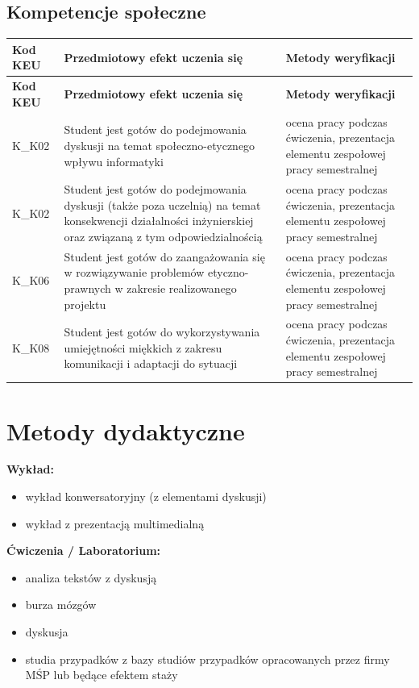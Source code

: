 \documentclass[12pt, a4paper]{article}
\newcommand{\thdrule}{\noalign{\global\setlength{\extrarowheight}{0pt}}}
\newcommand{\thdend}{\noalign{\global\setlength{\extrarowheight}{3pt}}}
\begin{document}
\subsection*{Kompetencje społeczne}
{\scriptsize
\begin{longtable}{m{1.6cm}m{9.0cm}m{4.2cm}}
\thdrule\toprule
\rowcolor{pjatkRed} {\color{white}\footnotesize\textbf{\vphantom{Ag}Kod KEU}} & {\color{white}\footnotesize\textbf{\vphantom{Ag}Przedmiotowy efekt uczenia się}} & {\color{white}\footnotesize\textbf{\vphantom{Ag}Metody weryfikacji}} \\
\midrule\thdend
\endfirsthead
\thdrule\toprule
\rowcolor{pjatkRed} {\color{white}\footnotesize\textbf{\vphantom{Ag}Kod KEU}} & {\color{white}\footnotesize\textbf{\vphantom{Ag}Przedmiotowy efekt uczenia się}} & {\color{white}\footnotesize\textbf{\vphantom{Ag}Metody weryfikacji}} \\
\midrule\thdend
\endhead
  \rowcolor{tableRowLight} K\_K02 & Student jest gotów do  podejmowania dyskusji na temat społeczno-etycznego wpływu informatyki & ocena pracy podczas ćwiczenia, prezentacja elementu zespołowej pracy semestralnej \\
  \rowcolor{tableRowAlt} K\_K02 & Student jest gotów do  podejmowania dyskusji (także poza uczelnią) na temat konsekwencji działalności inżynierskiej oraz związaną z tym odpowiedzialnością & ocena pracy podczas ćwiczenia, prezentacja elementu zespołowej pracy semestralnej \\
  \rowcolor{tableRowLight} K\_K06 & Student jest gotów do  zaangażowania się w rozwiązywanie problemów etyczno-prawnych w zakresie realizowanego projektu & ocena pracy podczas ćwiczenia, prezentacja elementu zespołowej pracy semestralnej \\
  \rowcolor{tableRowAlt} K\_K08 & Student jest gotów do  wykorzystywania umiejętności miękkich z zakresu komunikacji i adaptacji do sytuacji & ocena pracy podczas ćwiczenia, prezentacja elementu zespołowej pracy semestralnej \\
\bottomrule
\end{longtable}}

\section{Metody dydaktyczne}

\textbf{Wykład:}
\begin{itemize}
  \item wykład konwersatoryjny (z elementami dyskusji)
  \item wykład z prezentacją multimedialną
\end{itemize}
\vspace{4pt}
\textbf{Ćwiczenia / Laboratorium:}
\begin{itemize}
  \item analiza tekstów z dyskusją
  \item burza mózgów
  \item dyskusja
  \item studia przypadków z bazy studiów przypadków opracowanych przez firmy MŚP lub będące efektem staży
\end{itemize}
\vspace{4pt}
\end{document}
